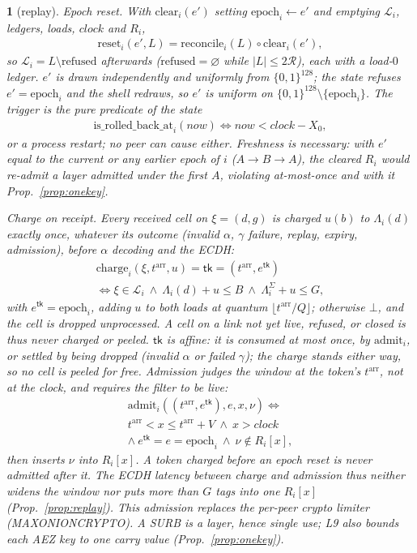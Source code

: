 \documentclass[journal]{IEEEtran}
\newcommand{\namedhead}{}
\newtheorem*{namedenv}{\namedhead}
\newenvironment{lawL}[2]{\renewcommand{\namedhead}{Law #1}%
  \begin{namedenv}[#2]}{\end{namedenv}}
\newcommand{\arr}{t^{\mathrm{arr}}}
\DeclareRobustCommand{\code}[1]{{\ttfamily\renewcommand{\_}{\textunderscore\allowbreak}#1}}
\begin{document}
\begin{lawL}{L9}{replay}
\emph{Epoch reset.}  With $\mathrm{clear}_i(e')$ setting
$\mathrm{epoch}_i\gets e'$ and emptying $\mathcal L_i$, ledgers, loads,
$\mathit{clock}$ and $R_i$,
\begin{gather*}
\mathrm{reset}_i(e',L)=\mathrm{reconcile}_i(L)\circ\mathrm{clear}_i(e'),
\end{gather*}
so $\mathcal L_i=L\setminus\mathrm{refused}$ afterwards
($\mathrm{refused}=\varnothing$ while $|L|\le2\mathcal R$), each with a
load-$0$ ledger.  $e'$ is drawn independently and uniformly from
$\{0,1\}^{128}$; the state refuses $e'=\mathrm{epoch}_i$ and the shell
redraws, so $e'$ is uniform on $\{0,1\}^{128}\setminus\{\mathrm{epoch}_i\}$.
The trigger is the pure predicate of the state
\begin{gather*}
\mathrm{is\_rolled\_back\_at}_i(\mathit{now})\iff
\mathit{now}<\mathit{clock}-X_0,
\end{gather*}
or a process restart; no peer can cause either.  Freshness is
necessary: with $e'$ equal to the current or any earlier epoch of $i$
($A\to B\to A$), the cleared $R_i$ would re-admit a layer admitted under
the first $A$, violating at-most-once and with it
Prop.~\ref{prop:onekey}.

\emph{Charge on receipt.}  Every received cell on $\xi=(d,g)$ is charged $u(b)$ to
$\Lambda_i(d)$ exactly once, whatever its outcome (invalid $\alpha$,
$\gamma$ failure, replay, expiry, admission), before $\alpha$ decoding and
the ECDH:
\begin{gather*}
\mathrm{charge}_i(\xi,\arr,u)=\mathsf{tk}=(\arr,e^{\mathsf{tk}})\\
\iff\xi\in\mathcal L_i\ \wedge\ \Lambda_i(d)+u\le B\ \wedge\
\Lambda_i^{\Sigma}+u\le G,
\end{gather*}
with $e^{\mathsf{tk}}=\mathrm{epoch}_i$, adding $u$ to both loads at
quantum $\lfloor\arr/Q\rfloor$; otherwise $\bot$, and the cell is dropped
unprocessed.  A cell on a link not yet live, refused, or closed is thus
never charged or peeled.  $\mathsf{tk}$ is affine: it is consumed at most
once, by $\mathrm{admit}_i$, or settled by being dropped (invalid $\alpha$
or failed $\gamma$); the charge stands either way, so no cell is peeled
for free.  Admission judges the window at the token's
$\arr$, not at the clock, and requires the filter to be live:
\begin{multline*}
\mathrm{admit}_i((\arr,e^{\mathsf{tk}}),e,x,\nu)\iff{}\\
\arr<x\le\arr+V\ \wedge\ x>\mathit{clock}\\
\wedge\ e^{\mathsf{tk}}=e=\mathrm{epoch}_i\ \wedge\
\nu\notin R_i[x],
\end{multline*}
then inserts $\nu$ into $R_i[x]$.  A token charged before an epoch reset
is never admitted after it.  The ECDH latency between charge and
admission thus neither widens the window nor puts more than $G$ tags into
one $R_i[x]$ (Prop.~\ref{prop:replay}).  This admission replaces the per-peer
crypto limiter (\code{MAX\_ONION\_CRYPTO\_*}).  A SURB is a layer, hence
single use; L9 also bounds each AEZ key to one carry value
(Prop.~\ref{prop:onekey}).
\end{lawL}
\end{document}
